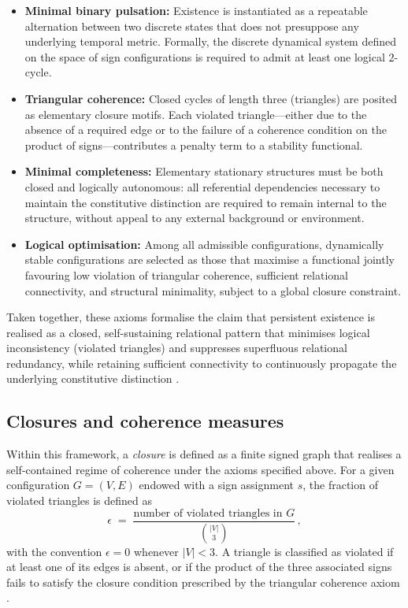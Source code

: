 \documentclass{article}
\begin{document}
\begin{itemize}[leftmargin=1.5em]
  \item \textbf{Minimal binary pulsation:} Existence is instantiated as a repeatable alternation between two discrete states that does not presuppose any underlying temporal metric. Formally, the discrete dynamical system defined on the space of sign configurations is required to admit at least one logical 2-cycle.

  \item \textbf{Triangular coherence:} Closed cycles of length three (triangles) are posited as elementary closure motifs. Each violated triangle—either due to the absence of a required edge or to the failure of a coherence condition on the product of signs—contributes a penalty term to a stability functional.

  \item \textbf{Minimal completeness:} Elementary stationary structures must be both closed and logically autonomous: all referential dependencies necessary to maintain the constitutive distinction are required to remain internal to the structure, without appeal to any external background or environment.

  \item \textbf{Logical optimisation:} Among all admissible configurations, dynamically stable configurations are selected as those that maximise a functional jointly favouring low violation of triangular coherence, sufficient relational connectivity, and structural minimality, subject to a global closure constraint.
\end{itemize}

Taken together, these axioms formalise the claim that persistent existence is realised as a closed, self-sustaining relational pattern that minimises logical inconsistency (violated triangles) and suppresses superfluous relational redundancy, while retaining sufficient connectivity to continuously propagate the underlying constitutive distinction \citep{PDL_Main_2026,PDL_position}.

\subsection{Closures and coherence measures}
\label{subsec:closures}

Within this framework, a \emph{closure} is defined as a finite signed graph that realises a self-contained regime of coherence under the axioms specified above. For a given configuration \(G = (V, E)\) endowed with a sign assignment \(s\), the fraction of violated triangles is defined as
\[
  \epsilon \;=\; \frac{\text{number of violated triangles in } G}{\binom{|V|}{3}} \, ,
\]
with the convention \(\epsilon = 0\) whenever \(|V| < 3\). A triangle is classified as violated if at least one of its edges is absent, or if the product of the three associated signs fails to satisfy the closure condition prescribed by the triangular coherence axiom \citep{PDL_Main_2026}.
\end{document}
